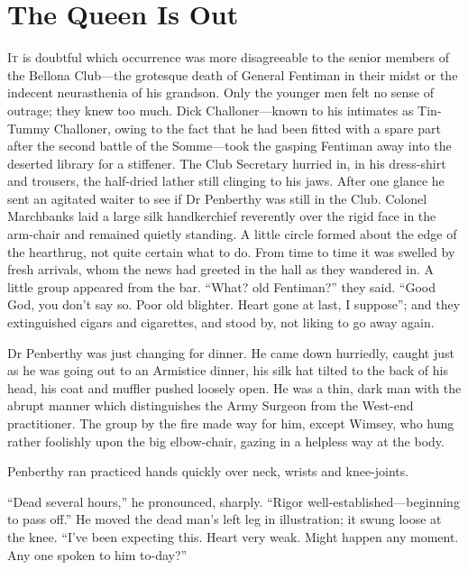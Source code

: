 \chapter{The Queen Is Out}
\lettrine[lines=4]{I}{t} is doubtful which occurrence was more disagreeable to the senior members of the Bellona Club\allowbreak---\allowbreak the grotesque death of General Fentiman in their midst or the indecent neurasthenia of his grandson. Only the younger men felt no sense of outrage; they knew too much. Dick Challoner\allowbreak---\allowbreak known to his intimates as Tin-Tummy Challoner, owing to the fact that he had been fitted with a spare part after the second battle of the Somme\allowbreak---\allowbreak took the gasping Fentiman away into the deserted library for a stiffener. The Club Secretary hurried in, in his dress-shirt and trousers, the half-dried lather still clinging to his jaws. After one glance he sent an agitated waiter to see if Dr Penberthy was still in the Club. Colonel Marchbanks laid a large silk handkerchief reverently over the rigid face in the arm-chair and remained quietly standing. A little circle formed about the edge of the hearthrug, not quite certain what to do. From time to time it was swelled by fresh arrivals, whom the news had greeted in the hall as they wandered in. A little group appeared from the bar. \enquote{What? old Fentiman?} they said. \enquote{Good God, you don't say so. Poor old blighter. Heart gone at last, I suppose}; and they extinguished cigars and cigarettes, and stood by, not liking to go away again.

Dr Penberthy was just changing for dinner. He came down hurriedly, caught just as he was going out to an Armistice dinner, his silk hat tilted to the back of his head, his coat and muffler pushed loosely open. He was a thin, dark man with the abrupt manner which distinguishes the Army Surgeon from the West-end practitioner. The group by the fire made way for him, except Wimsey, who hung rather foolishly upon the big elbow-chair, gazing in a helpless way at the body.

Penberthy ran practiced hands quickly over neck, wrists and knee-joints.

\enquote{Dead several hours,} he pronounced, sharply. \enquote{Rigor well-established\allowbreak---\allowbreak beginning to pass off.} He moved the dead man's left leg in illustration; it swung loose at the knee. \enquote{I've been expecting this. Heart very weak. Might happen any moment. Any one spoken to him to-day?}

